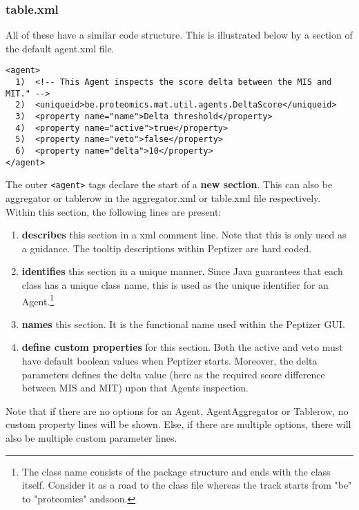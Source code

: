 \subsubsection{table.xml}
\npar All of these have a similar code structure. This is illustrated below by a section of the default agent.xml file.
%
\begin{verbatim}
<agent>
  1)  <!-- This Agent inspects the score delta between the MIS and MIT." -->
  2)  <uniqueid>be.proteomics.mat.util.agents.DeltaScore</uniqueid>
  3)  <property name="name">Delta threshold</property>
  4)  <property name="active">true</property>
  5)  <property name="veto">false</property>
  6)  <property name="delta">10</property>
</agent>
\end{verbatim}
%
\npar The outer \verb!<agent>! tags declare the start of a \textbf{new section}. This can also be aggregator or tablerow in the aggregator.xml or table.xml file respectively. Within this section, the following lines are present:
\renewcommand{\labelenumi}{\textbf{line \arabic{enumi}}.}
\begin{enumerate}
\item \textbf{describes} this section in a xml comment line. Note that this is only used as a guidance. The tooltip descriptions within Peptizer are hard coded.
\item \textbf{identifies} this section in a unique manner. Since Java guarantees that each class has a unique class name, this is used as the unique identifier for an Agent.\footnote{The class name consists of the package structure and ends with the class itself. Consider it as a road to the class file whereas the track starts from "be" to "proteomics" andsoon.}
\item \textbf{names} this section. It is the functional name used within the Peptizer GUI.
%
\renewcommand{\labelenumi}{\textbf{line \arabic{enumi}56}.}
%
\item \textbf{define custom properties} for this section. Both the active and veto must have default boolean values when Peptizer starts. Moreover, the delta parameters defines the delta value (here as the required score difference between MIS and MIT) upon that Agents inspection.
\end{enumerate}
\npar Note that if there are no options for an Agent, AgentAggregator or Tablerow, no custom property lines will be shown. Else, if there are multiple options, there will also be multiple custom parameter lines.
%
%
